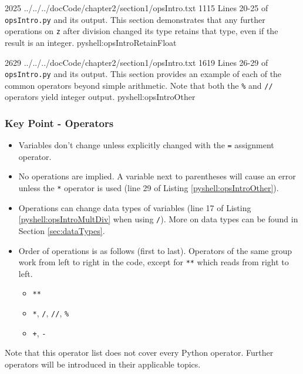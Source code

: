 \documentclass[oneside]{book}
\begin{document}
{20}{25}
{../../../docCode/chapter2/section1/opsIntro.txt}
{11}{15}
{Lines 20-25 of \texttt{opsIntro.py} and its output. This section demonstrates that any further operations on \texttt{z} after division changed its type retains that type, even if the result is an integer.}
{pyshell:opsIntroRetainFloat}

{26}{29}
{../../../docCode/chapter2/section1/opsIntro.txt}
{16}{19}
{Lines 26-29 of \texttt{opsIntro.py} and its output. This section provides an example of each of the common operators beyond simple arithmetic. Note that both the \texttt{\%} and \texttt{//} operators yield integer output.}
{pyshell:opsIntroOther}

\FloatBarrier

\subsubsection*{Key Point - Operators}
\begin{itemize}
\item Variables don't change unless explicitly changed with the \texttt{=} assignment operator.
\item No operations are implied. A variable next to parentheses will cause an error unless the \texttt{*} operator is used (line 29 of Listing \ref{pyshell:opsIntroOther}).
\item Operations can change data types of variables (line 17 of Listing \ref{pyshell:opsIntroMultDiv} when using \texttt{/}). More on data types can be found in Section \ref{sec:dataTypes}.
\item Order of operations is as follows (first to last). Operators of the same group work from left to right in the code, except for \texttt{**} which reads from right to left.
	\begin{itemize}
	\item[] \texttt{**}
	\item[] \texttt{*}, \texttt{/}, \texttt{//}, \texttt{\%}
	\item[] \texttt{+}, \texttt{-}
	\end{itemize}
\end{itemize}
Note that this operator list does not cover every Python operator. Further operators will be introduced in their applicable topics.
\end{document}
